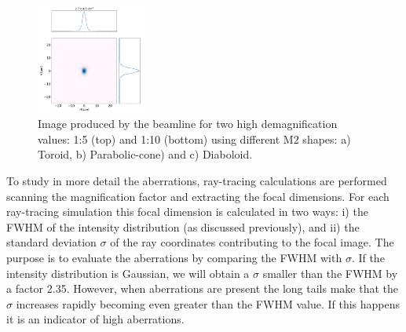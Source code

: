\documentclass{iucr}              %
\begin{document}
\begin{figure}[h]
\includegraphics[width=0.32\textwidth]{figures/M0p1_diaboloid.png}
\caption{\label{fig:demagnification}
Image produced by the beamline for two high demagnification values: 1:5 (top) and 1:10 (bottom) using different M2 shapes: a) Toroid, b) Parabolic-cone) and c) Diaboloid.}
\end{figure}


To study in more detail the aberrations, ray-tracing calculations are performed scanning the magnification factor and extracting the focal dimensions. For each ray-tracing simulation this focal dimension is calculated in two ways: i) the FWHM of the intensity distribution (as discussed previously), and ii) the standard deviation $\sigma$ of the ray coordinates contributing to the focal image. The purpose is to evaluate the aberrations by comparing the FWHM with $\sigma$. If the intensity distribution is Gaussian, we will obtain a $\sigma$ smaller than the FWHM by a factor 2.35. However, when aberrations are present the long tails make that the $\sigma$ increases rapidly becoming even greater than the FWHM value. If this happens it is an indicator of high aberrations.  
\end{document}
